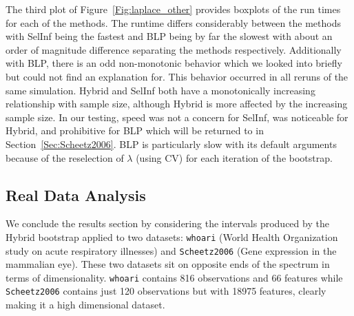 The third plot of Figure~\ref{Fig:laplace_other} provides boxplots of the run times for each of the methods. The runtime differs considerably between the methods with SelInf being the fastest and BLP being by far the slowest with about an order of magnitude difference separating the methods respectively. Additionally with BLP, there is an odd non-monotonic behavior which we looked into briefly but could not find an explanation for. This behavior occurred in all reruns of the same simulation. Hybrid and SelInf both have a monotonically increasing relationship with sample size, although Hybrid is more affected by the increasing sample size. In our testing, speed was not a concern for SelInf, was noticeable for Hybrid, and prohibitive for BLP which will be returned to in Section~\ref{Sec:Scheetz2006}. BLP is particularly slow with its default arguments because of the reselection of $\lambda$ (using CV) for each iteration of the bootstrap.



\subsection{Real Data Analysis}\label{Sec:RDA}

We conclude the results section by considering the intervals produced by the Hybrid bootstrap applied to two datasets: \texttt{whoari} (World Health Organization study on acute respiratory illnesses) and \texttt{Scheetz2006} (Gene expression in the mammalian eye). These two datasets sit on opposite ends of the spectrum in terms of dimensionality. \texttt{whoari} contains 816 observations and 66 features while \texttt{Scheetz2006} contains just 120 observations but with 18975 features, clearly making it a high dimensional dataset.

